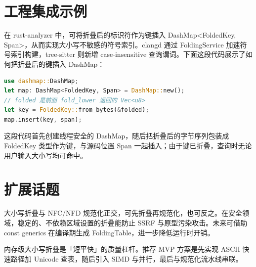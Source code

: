 \chapter{工程集成示例}
在 rust-analyzer 中，可将折叠后的标识符作为键插入 DashMap<FoldedKey, Span>，从而实现大小写不敏感的符号索引。clangd 通过 FoldingService 加速符号索引构建，tree-sitter 则新增 case-insensitive 查询谓词。下面这段代码展示了如何把折叠后的键插入 DashMap：\par
\begin{lstlisting}[language=rust]
use dashmap::DashMap;
let map: DashMap<FoldedKey, Span> = DashMap::new();
// folded 是前面 fold_lower 返回的 Vec<u8>
let key = FoldedKey::from_bytes(&folded);
map.insert(key, span);
\end{lstlisting}
这段代码首先创建线程安全的 DashMap，随后把折叠后的字节序列包装成 FoldedKey 类型作为键，与源码位置 Span 一起插入；由于键已折叠，查询时无论用户输入大小写均可命中。\par
\chapter{扩展话题}
大小写折叠与 NFC/NFD 规范化正交，可先折叠再规范化，也可反之。在安全领域，稳定的、不依赖区域设置的折叠能防止 SSRF 与原型污染攻击。未来可借助 const generics 在编译期生成 FoldingTable，进一步降低运行时开销。\par
内存级大小写折叠是「短平快」的质量杠杆。推荐 MVP 方案是先实现 ASCII 快速路径加 Unicode 查表，随后引入 SIMD 与并行，最后与规范化流水线串联。\par
